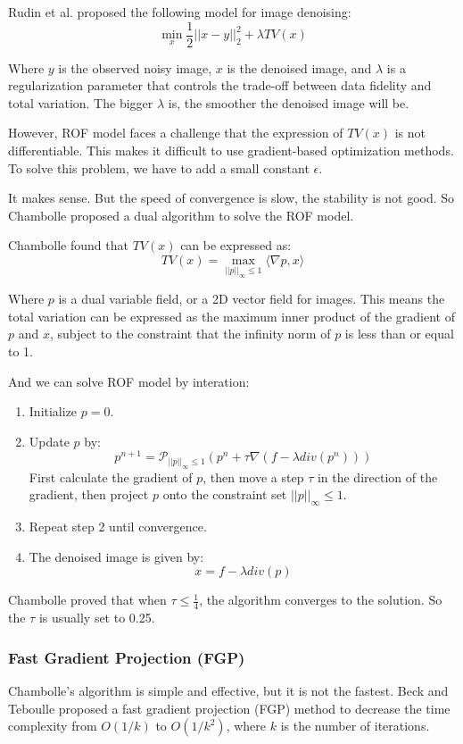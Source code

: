 \documentclass[12pt]{ctexart}
\begin{document}
Rudin et al. proposed the following model for image denoising:
\[
  \min_x \frac{1}{2} ||x - y||_2^2 + \lambda TV(x)
\]

Where $y$ is the observed noisy image, $x$ is the denoised image, and $\lambda$ is
a regularization parameter that controls the trade-off between data fidelity and
total variation. The bigger $\lambda$ is, the smoother the denoised image will be.

However, ROF model faces a challenge that the expression of $TV(x)$ is not
differentiable. This makes it difficult to use gradient-based optimization
methods. To solve this problem, we have to add a small constant $\epsilon$.

It makes sense. But the speed of convergence is slow, the stability is not good. So
Chambolle proposed a dual algorithm to solve the ROF model.

Chambolle found that $TV(x)$ can be expressed as:
\[
  TV(x) = \max_{||p||_\infty \leq 1} \langle \nabla p, x \rangle
\]

Where $p$ is a dual variable field, or a 2D vector field for images. This means
the total variation can be expressed as the maximum inner product of the gradient
of $p$ and $x$, subject to the constraint that the infinity norm of $p$ is less
than or equal to 1.

And we can solve ROF model by interation:
\begin{enumerate}
  \item Initialize $p = 0$.
  \item Update $p$ by:
  \[
    p^{n+1} = \mathcal{P}_{||p||_\infty \leq 1}(p^{n} + \tau \nabla (f - \lambda div(p^n)))
  \]
  First calculate the gradient of $p$, then move a step $\tau$ in the direction of
  the gradient, then project $p$ onto the constraint set $||p||_\infty \leq 1$.
  \item Repeat step 2 until convergence.
  \item The denoised image is given by:
  \[
    x = f - \lambda div(p)
  \]
\end{enumerate}

Chambolle proved that when $\tau \leq \frac14$, the algorithm converges to the
solution. So the $\tau$ is usually set to 0.25.

\subsubsection{\textbf{Fast Gradient Projection (FGP)}}

Chambolle's algorithm is simple and effective, but it is not the fastest. Beck and
Teboulle proposed a fast gradient projection (FGP) method to decrease the time
complexity from $O(1/k)$ to $O(1/k^2)$, where $k$ is the number of iterations.
\end{document}
